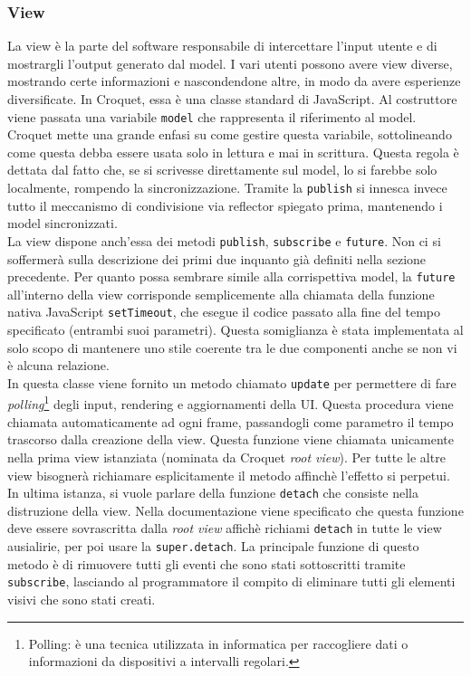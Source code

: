 \subsubsection{View}\label{subsubsec:Croquet_view}
La view è la parte del software responsabile di intercettare l'input utente e di mostrargli l'output generato dal model. I vari utenti possono avere view 
diverse, mostrando certe informazioni e nascondendone altre, in modo da avere esperienze diversificate. In Croquet, essa è una classe standard di JavaScript.
Al costruttore viene passata una variabile \texttt{model} che rappresenta il riferimento al model. Croquet mette una grande enfasi su come gestire questa variabile, 
sottolineando come questa debba essere usata solo in lettura e mai in scrittura. Questa regola è dettata dal fatto che, se si scrivesse direttamente sul model, lo si farebbe solo 
localmente, rompendo la sincronizzazione. Tramite la \texttt{publish} si innesca invece tutto il meccanismo di condivisione via reflector spiegato prima, mantenendo i model
sincronizzati.\\
\newline
La view dispone anch'essa dei metodi \texttt{publish}, \texttt{subscribe} e \texttt{future}. Non ci si soffermerà sulla descrizione dei primi due inquanto già definiti
nella sezione precedente. Per quanto possa sembrare simile alla corrispettiva model, la \texttt{future} all'interno della view corrisponde semplicemente alla chiamata della 
funzione nativa JavaScript \texttt{setTimeout}, che esegue il codice passato alla fine del tempo specificato (entrambi suoi parametri). Questa somiglianza è stata implementata al 
solo scopo di mantenere uno stile coerente tra le due componenti anche se non vi è alcuna relazione.\\
\newline
In questa classe viene fornito un metodo chiamato \texttt{update} per permettere di fare \textit{polling}\footnote{
    Polling: è una tecnica utilizzata in informatica per raccogliere dati o informazioni da dispositivi a intervalli regolari.

} degli input, rendering e aggiornamenti della UI. Questa procedura viene chiamata
automaticamente ad ogni frame, passandogli come parametro il tempo trascorso dalla creazione della view. Questa funzione viene chiamata unicamente nella prima
view istanziata (nominata da Croquet \textit{root view}). Per tutte le altre view bisognerà richiamare esplicitamente il metodo affinchè l'effetto si perpetui.\\
\newline
In ultima istanza, si vuole parlare della funzione \texttt{detach} che consiste nella distruzione della view. Nella documentazione viene specificato che questa funzione deve essere
sovrascritta dalla \textit{root view} affichè richiami \texttt{detach} in tutte le view ausialirie, per poi usare la \texttt{super.detach}. La principale funzione di questo metodo
è di rimuovere tutti gli eventi che sono stati sottoscritti tramite \texttt{subscribe}, lasciando al programmatore il compito di eliminare tutti gli elementi visivi che sono stati
creati.\\

